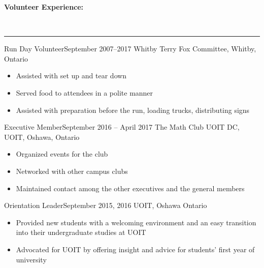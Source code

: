 \documentclass[]{article}
\makeatletter
\newcommand{\heading}[1]
{\begin{large}\textbf{#1}\end{large}\\%
 \rule[1.2ex]{\linewidth}{0.4pt}}
\newenvironment{*subsection}[2]
{
\begin{tabu} to \linewidth {@{}X[l] r}
  \textbf{#1} &
  \textbf{#2}
\end{tabu}
}
{
  \vspace{3mm}
}
\makeatother
\begin{document}
\heading{Volunteer Experience:}
\begin{*subsection}{Run Day Volunteer}{September 2007--2017}
%
Whitby Terry Fox Committee, Whitby, Ontario
%
\begin{itemize}
\item
  Assisted with set up and tear down
\item
  Served food to attendees in a polite manner
\item
  Assisted with preparation before the run, loading trucks,
  distributing signs
\end{itemize}
\end{*subsection}
\begin{*subsection}{Executive Member}{September 2016 -- April 2017}
%
The Math Club UOIT DC, UOIT, Oshawa, Ontario
%
\begin{itemize}
\item
  Organized events for the club
\item
  Networked with other campus clubs
\item
  Maintained contact among the other executives and the general members
\end{itemize}
\end{*subsection}
\begin{*subsection}{Orientation Leader}{September 2015, 2016}
%
UOIT, Oshawa Ontario
%
\begin{itemize}
\item
  Provided new students with a welcoming environment and an easy
  transition into their undergraduate studies at UOIT
\item
  Advocated for UOIT by offering insight and advice for students'
  first year of university
\end{itemize}
\end{*subsection}
\end{document}

